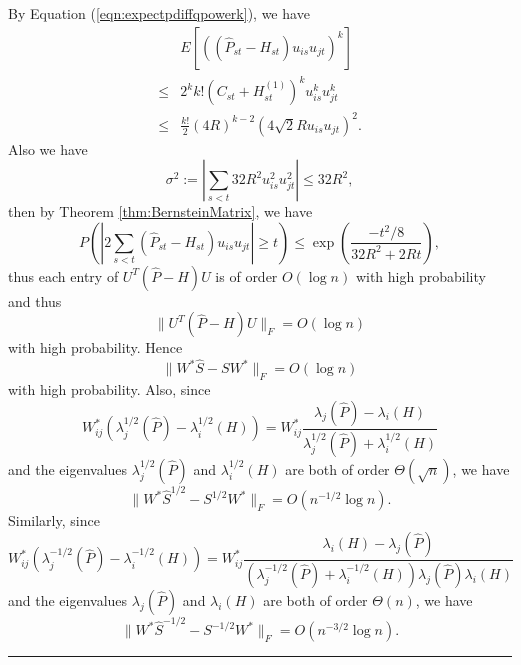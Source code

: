 \documentclass[a4paper]{article}
\newenvironment{proof}{{\bf Proof:  }}{\hfill\rule{2mm}{2mm}}
\begin{document}
\begin{proof}
By Equation (\ref{eqn:expectpdiffqpowerk}), we have
\begin{align*}
	& E\left[\left((\hat{P}_{st} - H_{st}) u_{is} u_{jt}\right)^k\right] \\ 
    \le & 2^k k! (C_{st} + H_{st}^{(1)})^k u_{is}^k u_{jt}^k \\
    \le & \frac{k!}{2} (4 R)^{k-2} (4\sqrt{2} R u_{is} u_{jt})^2.
\end{align*}
Also we have
\[
	\sigma^2 := |\sum_{s<t} 32 R^2 u_{is}^2 u_{jt}^2|
    \le 32 R^2,
\]
then by Theorem \ref{thm:BernsteinMatrix}, we have
\[
	P \left( \left| 2 \sum_{s<t} (\hat{P}_{st} - H_{st}) u_{is} u_{jt} \right| \ge t \right)
    \le \exp \left( \frac{-t^2/8}{32 R^2 + 2 R t} \right),
\]
thus each entry of $U^T(\hat{P} - H)U$ is of order $O(\log n)$ with high probability and thus 
\begin{equation}
\label{eqn:uPhatdiffHu}
	\|U^T(\hat{P} - H)U\|_F = O(\log n)
\end{equation}
with high probability.
Hence
\[
	\| W^* \hat{S} - S W^* \|_F = O(\log n)
\]
with high probability.
Also, since
\[
	W_{ij}^* (\lambda_j^{1/2}(\hat{P}) - \lambda_i^{1/2}(H)) = W_{ij}^* \frac{\lambda_j(\hat{P}) - \lambda_i(H)}{\lambda_j^{1/2}(\hat{P}) + \lambda_i^{1/2}(H)}
\]
and the eigenvalues $\lambda_j^{1/2}(\hat{P})$ and $\lambda_i^{1/2}(H)$ are both of order $\Theta(\sqrt{n})$, we have
\[
	\| W^* \hat{S}^{1/2} - S^{1/2} W^* \|_F = O(n^{-1/2} \log n).
\]
Similarly, since
\[
	W_{ij}^* (\lambda_j^{-1/2}(\hat{P}) - \lambda_i^{-1/2}(H)) = W_{ij}^* \frac{\lambda_i(H) - \lambda_j(\hat{P})}{(\lambda_j^{-1/2}(\hat{P}) + \lambda_i^{-1/2}(H))\lambda_j(\hat{P}) \lambda_i(H)}
\]
and the eigenvalues $\lambda_j(\hat{P})$ and $\lambda_i(H)$ are both of order $\Theta(n)$, we have
\[
	\| W^* \hat{S}^{-1/2} - S^{-1/2} W^* \|_F = O(n^{-3/2} \log n).
\]
\end{proof}
\end{document}
